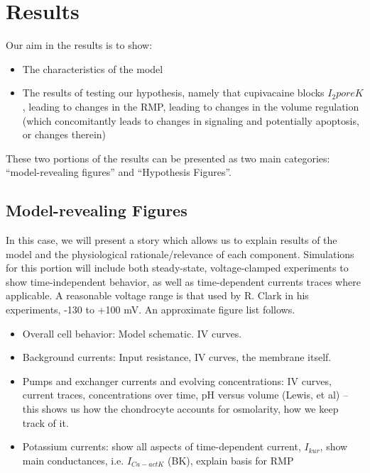 \section{Results}
\label{results}


Our aim in the results is to show:
\begin{itemize}
\item The characteristics of the model
\item The results of testing our hypothesis, namely that cupivacaine
  blocks $I_2poreK$, leading to changes in the RMP, leading to changes
  in the volume regulation (which concomitantly leads to changes in
  signaling and potentially apoptosis, or changes therein)
\end{itemize}

These two portions of the results can be presented as two main
categories: ``model-revealing figures'' and ``Hypothesis Figures''.

\subsection{Model-revealing Figures}
In this case, we will present a story which allows us to explain
results of the model and the physiological rationale/relevance of each
component. Simulations for this portion will include both
steady-state, voltage-clamped experiments to show time-independent
behavior, as well as time-dependent currents traces where
applicable. A reasonable voltage range is that used by R. Clark in his
experiments, -130 to +100 mV. An approximate figure list follows.

\begin{itemize}
\item Overall cell behavior: Model schematic. IV curves.
\item Background currents: Input resistance, IV curves, the membrane itself.
\item Pumps and exchanger currents and evolving concentrations: IV
  curves, current traces, concentrations over time, pH versus volume
  (Lewis, et al) -- this shows us how the chondrocyte accounts for
  osmolarity, how we keep track of it.
\item Potassium currents: show all aspects of time-dependent current,
  $I_{kur}$, show main conductances, i.e. $I_{Ca-act K}$ (BK), explain
  basis for RMP
\end{itemize}

